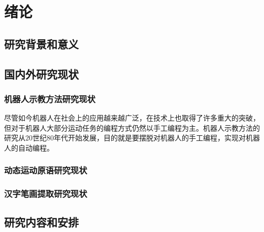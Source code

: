 \chapter{绪论}
\section{研究背景和意义}





\section{国内外研究现状}
\subsection{机器人示教方法研究现状}
尽管如今机器人在社会上的应用越来越广泛，在技术上也取得了许多重大的突破，但对于机器人大部分运动任务的编程方式仍然以手工编程为主\cite{Song2021}。机器人示教方法的研究从20世纪80年代开始发展，目的就是要摆脱对机器人的手工编程，实现对机器人的自动编程\cite{Chen2020}。




\subsection{动态运动原语研究现状}

\subsection{汉字笔画提取研究现状}

\section{研究内容和安排}


